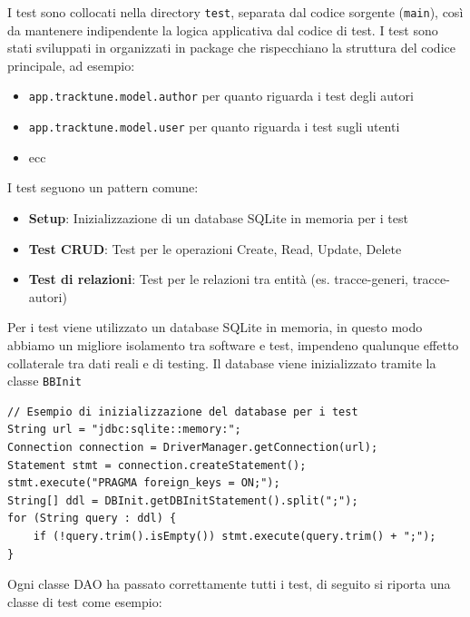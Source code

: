 \documentclass[a4paper]{article}
\begin{document}
\bigskip

I test sono collocati nella directory \texttt{test}, separata dal codice sorgente (\texttt{main}), così da mantenere indipendente la logica applicativa dal codice di test.
I test sono stati sviluppati in organizzati in package che rispecchiano la struttura del codice principale, ad esempio:
\begin{itemize}
    \item \texttt{app.tracktune.model.author} per quanto riguarda i test degli autori
    \item \texttt{app.tracktune.model.user} per quanto riguarda i test sugli utenti
    \item ecc
\end{itemize}

I test seguono un pattern comune:
\begin{itemize}
    \item \textbf{Setup}: Inizializzazione di un database SQLite in memoria per i test
    \item \textbf{Test CRUD}: Test per le operazioni Create, Read, Update, Delete
    \item \textbf{Test di relazioni}: Test per le relazioni tra entità (es. tracce-generi, tracce-autori)
\end{itemize}

Per i test viene utilizzato un database SQLite in memoria, in questo modo abbiamo un migliore isolamento tra software e test, impendeno qualunque effetto collaterale tra dati reali e di testing. Il database viene inizializzato tramite la classe \texttt{BBInit}

\begin{lstlisting}[style=java-style, caption={Esempio creazione database in memoria}]
// Esempio di inizializzazione del database per i test
String url = "jdbc:sqlite::memory:";
Connection connection = DriverManager.getConnection(url);
Statement stmt = connection.createStatement();
stmt.execute("PRAGMA foreign_keys = ON;");
String[] ddl = DBInit.getDBInitStatement().split(";");
for (String query : ddl) {
    if (!query.trim().isEmpty()) stmt.execute(query.trim() + ";");
}
\end{lstlisting}

Ogni classe DAO ha passato correttamente tutti i test, di seguito si riporta una classe di test come esempio:
\end{document}
